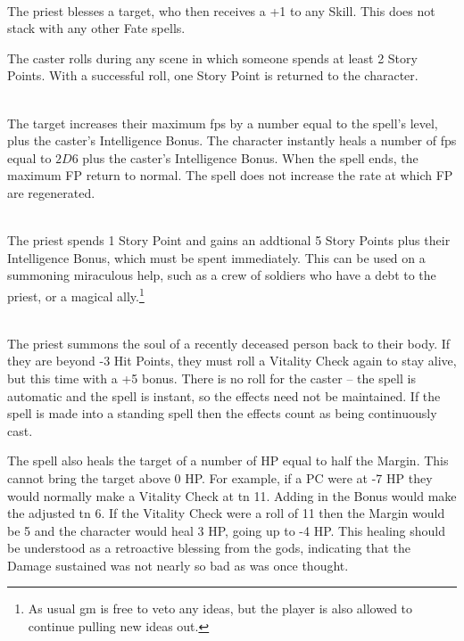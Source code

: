 \begin{multicols}{2}
\\
The priest blesses a target, who then receives a +1 to any Skill.
This does not stack with any other Fate spells.

The caster rolls during any scene in which someone spends at least 2 Story Points.  With a successful roll, one Story Point is returned to the character.

\spelllevel

\\
The target increases their maximum \glspl{fp} by a number equal to the spell's level, plus the caster's Intelligence Bonus.
The character instantly heals a number of \glspl{fp} equal to $2D6$ plus the caster's Intelligence Bonus.
When the spell ends, the maximum FP return to normal.
The spell does not increase the rate at which FP are regenerated.

\spelllevel

\\
The priest spends 1 Story Point and gains an addtional 5 Story Points plus their Intelligence Bonus, which must be spent immediately.  This can be used on a summoning miraculous help, such as a crew of soldiers who have a debt to the priest, or a magical ally.\footnote{As usual \gls{gm} is free to veto any ideas, but the player is also allowed to continue pulling new ideas out.}

\\
The priest summons the soul of a recently deceased person back to their body. If they are beyond -3 Hit Points, they must roll a Vitality Check again to stay alive, but this time with a +5 bonus. There is no roll for the caster -- the spell is automatic and the spell is instant, so the effects need not be maintained. If the spell is made into a standing spell then the effects count as being continuously cast.

The spell also heals the target of a number of HP equal to half the Margin. This cannot bring the target above 0 HP. For example, if a PC were at -7 HP they would normally make a Vitality Check at \gls{tn} 11. Adding in the Bonus would make the adjusted \gls{tn} 6. If the Vitality Check were a roll of 11 then the Margin would be 5 and the character would heal 3 HP, going up to -4 HP. This healing should be understood as a retroactive blessing from the gods, indicating that the Damage sustained was not nearly so bad as was once thought.


\end{multicols}
